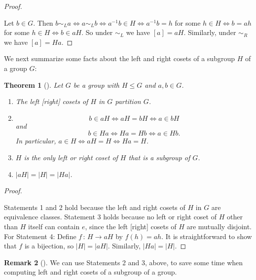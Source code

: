 \documentclass[10pt,]{book}
\theoremstyle{plain}
\newtheorem{theorem}{Theorem}[section]
\theoremstyle{definition}
\theoremstyle{definition}
\newtheorem{remark}[theorem]{Remark}
\theoremstyle{definition}
\theoremstyle{definition}
\numberwithin{equation}{section}
\def\siml{\sim_L}
\def\simr{\sim_R}
\begin{document}
\begin{proof}\hypertarget{proof-38}{}
Let \(b\in G\). Then \(b\siml a \Leftrightarrow a \siml b
\Leftrightarrow a^{-1}b\in H \Leftrightarrow a^{-1}b=h\) for some \(h\in H \Leftrightarrow b=ah\) for some \(h\in H \Leftrightarrow b\in
aH\). So under \(\siml\) we have \([a]=aH\). Similarly, under \(\simr\) we have \([a]=Ha\).%
\end{proof}
We next summarize some facts about the left and right cosets of a subgroup \(H\) of a group \(G\):%
\begin{theorem}[{}]\label{cosetfacts}
Let \(G\) be a group with \(H\leq G\) and \(a,b\in G\). \leavevmode%
\begin{enumerate}
\item\hypertarget{li-400}{}The left [right] cosets of \(H\) in \(G\) partition \(G\).%
\item\hypertarget{li-401}{}%
\begin{equation*}
b\in aH \Leftrightarrow aH=bH \Leftrightarrow  a\in bH
\end{equation*}
and%
\begin{equation*}
b\in Ha \Leftrightarrow  Ha=Hb \Leftrightarrow  a\in
Hb.
\end{equation*}
In particular, \(a\in H \Leftrightarrow aH=H \Leftrightarrow Ha=H\).%
\item\hypertarget{li-402}{}\(H\) is the only left or right coset of \(H\) that is a \emph{subgroup} of \(G\).%
\item\hypertarget{li-403}{}\(|aH|=|H|=|Ha|\).%
\end{enumerate}
%
\end{theorem}
\begin{proof}\hypertarget{proof-39}{}
Statements 1 and 2 hold because the left and right cosets of \(H\) in \(G\) are equivalence classes. Statement 3 holds because no left or right coset of \(H\) other than \(H\) itself can contain \(e\), since the left [right] cosets of \(H\) are mutually disjoint. For Statement 4: Define \(f\,:\,H\to aH\) by \(f(h)=ah\). It is straightforward to show that \(f\) is a bijection, so \(|H|=|aH|\). Similarly, \(|Ha|=|H|\).%
\end{proof}
\begin{remark}[]\label{remark-36}
We can use Statements 2 and 3, above, to save some time when computing left and right cosets of a subgroup of a group.%
\end{remark}
\end{document}
